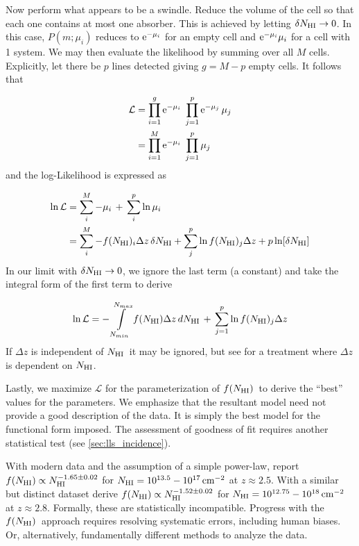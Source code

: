 \documentclass[graybox]{svmult}
\def\smm{\sum\limits}
\def\intl{\int\limits}
\newcommand{\mnhi}{N_{\rm HI}}
\newcommand{\nhi}{$\mnhi$}
\def\cm#1{\, {\rm cm^{#1}}}
\def\mfnhi{f(\mnhi)}
\def\fnhi{$\mfnhi$}
\def\prodl{\prod\limits}
\begin{document}
Now perform what appears to be a swindle.
Reduce the volume of the cell so that each one contains
at most one absorber.  This is achieved by letting
$\delta\mnhi \to 0$.
In this case, $P(m;\mu_i)$ reduces to ${\rm e}^{-\mu_i}$ for an
empty cell and ${\rm e}^{-\mu_i} \mu_i$ for a cell with 1 system.
We may then evaluate the likelihood
by summing over all $M$ cells.  Explicitly,  
let there be $p$ lines detected giving $g=M-p$ empty cells.
It follows that 

\begin{align}
\mathcal{L} &= \prodl_{i=1}^g {\rm e}^{-\mu_i} \;
\prodl_{j=1}^p {\rm e}^{-\mu_j} \, \mu_j \\
&= \prodl_{i=1}^M {\rm e}^{-\mu_i} \; \prodl_{j=1}^p \mu_j
\end{align}
and the log-Likelihood is expressed as

\begin{align}
\ln \mathcal{L} &= \smm_i^M -\mu_i \, + \, \smm_i^p \ln \mu_i \\
&= \smm_i^M -f(\mnhi)_i \Delta z \, \delta\mnhi +
\smm_j^p \ln f(\mnhi)_j \Delta z + p \ln [\delta\mnhi]
\label{eqn:max_fN}
\end{align}
In our limit with $\delta\mnhi \to 0$,
we ignore the last term (a constant) and take the integral form
of the first term to derive

\begin{equation}
\ln \mathcal{L} = - \intl_{N_{min}}^{N_{max}} f(\mnhi) \Delta z \, d\mnhi 
\, + \, \smm_{j=1}^p \ln f(\mnhi)_j \Delta z
\end{equation}
If $\Delta z$ is independent of \nhi\ it may be ignored,
but see \cite{ctp+10} for a treatment where
$\Delta z$ is dependent on \nhi.

Lastly, we maximize $\mathcal{L}$ for the parameterization of \fnhi\
to derive the ``best'' values for the parameters.
We emphasize that the resultant model need not 
provide a good description of the data.  It is simply the 
best model for the functional form imposed.
The assessment of goodness of fit requires another statistical
test (see \ref{sec:lls_incidence}).

With modern data and the assumption of a simple
power-law, \cite{rudie13} report
$\mfnhi \propto \mnhi^{-1.65 \pm 0.02}$ for
$\mnhi = 10^{13.5} - 10^{17} \cm{-2}$ at $z \approx 2.5$.
With a similar but distinct dataset 
\cite{kim13} derive
$\mfnhi \propto \mnhi^{-1.52 \pm 0.02}$
for $\mnhi = 10^{12.75} - 10^{18} \cm{-2}$
at $z \approx 2.8$.
Formally, these are statistically incompatible.
Progress with the \fnhi\ approach
requires resolving systematic errors, including
human biases.  Or, alternatively, fundamentally
different methods to analyze the data. 
\end{document}
